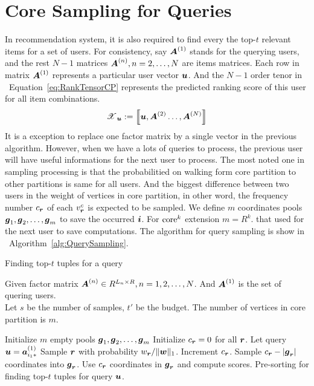 \documentclass[letterpaper]{article}
\newcommand{\T}[1]{\boldsymbol{\mathscr{{#1}}}}
\newcommand{\KT}[1]{\left\llbracket #1 \right\rrbracket}
\newcommand{\V}[1]{{\bm{{\MakeLowercase{#1}}}}}
\newcommand{\VnC}[3]{\V{#1}^{(#2)}_{#3}}
\newcommand{\M}[1]{{\bm{{\MakeUppercase{#1}}}}}
\newcommand{\Mn}[2]{\M{#1}^{(#2)}}
\newcommand{\norm}[2]{\|#1\|_{#2}}
\newcommand{\Eqn}[1]   {Equation~\ref{eq:#1}}
\newcommand{\Alg}[1] {Algorithm~\ref{alg:#1}}
\begin{document}
\section{Core Sampling for Queries}
In recommendation system,
it is also required to find every the top-$t$ relevant items for a set of users.
For consistency,
say $\M{A}^{(1)}$ stands for the querying users,
and the rest $N-1$ matrices $\M{A}^{(n)},n=2,\ldots,N$ are items matrices.
Each row in matrix $\M{A}^{(1)}$ represents a particular user vector $\V{u}$.
And the $N-1$ order tenor in ~\Eqn{RankTensorCP}
represents the predicted ranking score of this user for all item combinations.
\begin{equation}\label{eq:RankTensorCP}
\T{X}_{\V{u}} := \KT{ \V{u},\Mn{A}{2}\dots,\Mn{A}{N}}
\end{equation}
It is a exception to replace one factor matrix by a single vector in the previous algorithm.
However, when we have a lots of queries to process,
the previous user will have useful informations for the next user to process.
The most noted one in sampling processing is that
the probabilitied on walking form core partition to other partitions is same for all users.
And the biggest difference between two users in the weight of vertices in core partition,
in other word,
the frequency number $c_{\V{r}}$ of each $v^c_{\V{r}}$ is expected to be sampled.
We define $m$ coordinates pools $\V{g}_1,\V{g}_2,\ldots,\V{g}_{m}$ to save the occurred $\V{i}$.
For ${\rm core}^k$ extension $m = R^k$.
that used for the next user to save computations.
The algorithm for query sampling is show in ~\Alg{QuerySampling}.

\begin{algorithm}[t]
    \caption{Finding top-$t$ tuples for a query}
    \label{alg:QuerySampling}
        Given factor matrix $\M{A}^{(n)}\in R^{L_n\times R}, n = 1,2,\ldots,N$.
        And $\M{A}^{(1)}$ is the set of quering users.\\
        Let $s$ be the number of samples, $t'$ be the budget.
        The number of vertices in core partition is $m$.
    \begin{algorithmic}[1]
    \State Initialize $m$ empty pools $\V{g}_1,\V{g}_2,\ldots,\V{g}_m$
    \State Initialize $c_{\V{r}} = 0$ for all $\V{r}$.
    \State Let query $\V{u}=\VnC{a}{1}{i_1*}$
    \State Sample $\V{r}$ with probability $w_\V{r}/\norm{\V{W}}{1}$.
    \label{line:Indexes}
    \State  Increment $c_{\V{r}}$.
    \EndFor
    \ForAll {$\V{r}$}
    \If {$c_r > |\V{g}_r|$ }
    \State Sample $c_{\V{r}} - |\V{g}_{\V{r}}|$ coordinates into $\V{g}_{\V{r}}$.
    \EndIf
    \State Use $c_{\V{r}}$ coordinates in $\V{g}_{\V{r}}$ and compute scores.
    \EndFor
    \State Pre-sorting for finding top-$t$ tuples for query $\V{u}$.
    \EndFor
    \end{algorithmic}
\end{algorithm}
\end{document}
